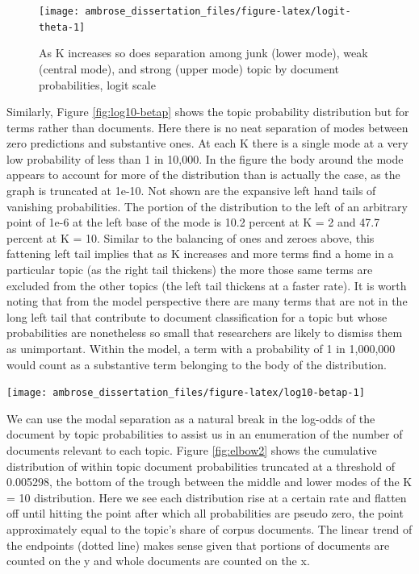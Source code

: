 \documentclass[]{book}
\theoremstyle{definition}
\theoremstyle{definition}
\theoremstyle{definition}
\theoremstyle{remark}
\begin{document}
\begin{figure}

{\centering \texttt{[image: ambrose\_dissertation\_files/figure-latex/logit-theta-1]} 

}

\caption{As K increases so does separation among junk (lower mode), weak (central mode), and strong (upper mode) topic by document probabilities, logit scale}\label{fig:logit-theta}
\end{figure}

Similarly, Figure \ref{fig:log10-betap} shows the topic probability
distribution but for terms rather than documents. Here there is no neat
separation of modes between zero predictions and substantive ones. At
each K there is a single mode at a very low probability of less than 1
in 10,000. In the figure the body around the mode appears to account for
more of the distribution than is actually the case, as the graph is
truncated at 1e-10. Not shown are the expansive left hand tails of
vanishing probabilities. The portion of the distribution to the left of
an arbitrary point of 1e-6 at the left base of the mode is 10.2 percent
at K = 2 and 47.7 percent at K = 10. Similar to the balancing of ones
and zeroes above, this fattening left tail implies that as K increases
and more terms find a home in a particular topic (as the right tail
thickens) the more those same terms are excluded from the other topics
(the left tail thickens at a faster rate). It is worth noting that from
the model perspective there are many terms that are not in the long left
tail that contribute to document classification for a topic but whose
probabilities are nonetheless so small that researchers are likely to
dismiss them as unimportant. Within the model, a term with a probability
of 1 in 1,000,000 would count as a substantive term belonging to the
body of the distribution.

\begin{center}\texttt{[image: ambrose\_dissertation\_files/figure-latex/log10-betap-1]} \end{center}

We can use the modal separation as a natural break in the log-odds of
the document by topic probabilities to assist us in an enumeration of
the number of documents relevant to each topic. Figure \ref{fig:elbow2}
shows the cumulative distribution of within topic document probabilities
truncated at a threshold of 0.005298, the bottom of the trough between
the middle and lower modes of the K = 10 distribution. Here we see each
distribution rise at a certain rate and flatten off until hitting the
point after which all probabilities are pseudo zero, the point
approximately equal to the topic's share of corpus documents. The linear
trend of the endpoints (dotted line) makes sense given that portions of
documents are counted on the y and whole documents are counted on the x.
\end{document}
